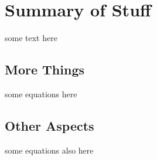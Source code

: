 
\section{Summary of Stuff}
some text here
\subsection{More Things}
some equations here

\subsection{Other Aspects}
some equations also here